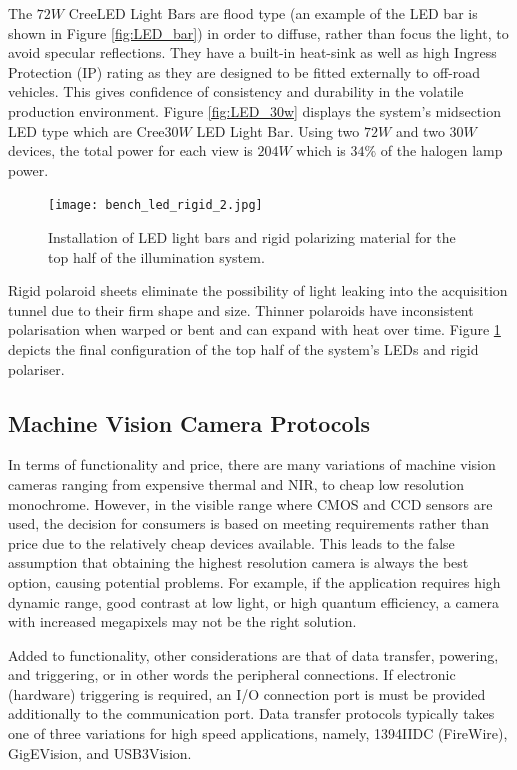 \documentclass[fleqn,twoside,12pt]{report}
\begin{document}
The $72W$ Cree\textregistered LED Light Bars are flood type (an example of the LED bar is shown in Figure \ref{fig:LED_bar}) in order to diffuse, rather than focus the light, to avoid specular reflections. They have a built-in heat-sink as well as high Ingress Protection (IP) rating as they are designed to be fitted externally to off-road vehicles. This gives confidence of consistency and durability in the volatile production environment. Figure \ref{fig:LED_30w} displays the system's midsection LED type which are Cree\textregistered $30W$ LED Light Bar. Using two $72W$ and two $30W$ devices, the total power for each view is $204W$ which is $34\%$ of the halogen lamp power.



\begin{figure}[h]
	\centering
	\texttt{[image: bench\_led\_rigid\_2.jpg]}
	\caption{Installation of LED light bars and rigid polarizing material for the top half of the illumination system.}
	\label{fig:bench_led_rigid}
\end{figure}%

Rigid polaroid sheets eliminate the possibility of light leaking into the acquisition tunnel due to their firm shape and size. Thinner polaroids have inconsistent polarisation when warped or bent and can expand with heat over time. Figure \ref{fig:bench_led_rigid} depicts the final configuration of the top half of the system's LEDs and rigid polariser.



\subsection{Machine Vision Camera Protocols}


In terms of functionality and price, there are many variations of machine vision cameras ranging from expensive thermal and NIR, to cheap low resolution monochrome. However, in the visible range where CMOS and CCD sensors are used, the decision for consumers is based on meeting requirements rather than price due to the relatively cheap devices available. This leads to the false assumption that obtaining the highest resolution camera is always the best option, causing potential problems. For example, if the application requires high dynamic range, good contrast at low light, or high quantum efficiency, a camera with increased megapixels may not be the right solution.

Added to functionality, other considerations are that of data transfer, powering, and triggering, or in other words the peripheral connections. If electronic (hardware) triggering is required, an I/O connection port is must be provided additionally to the communication port. Data transfer protocols typically takes one of three variations for high speed applications, namely, 1394IIDC (FireWire\texttrademark), GigEVision\textregistered, and USB3Vision\textregistered. 
\end{document}
